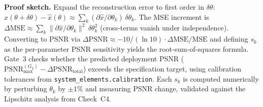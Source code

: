 \documentclass[11pt,a4paper]{article}
\begin{document}
\textbf{Proof sketch.}
Expand the reconstruction error to first order in $\delta\theta$: $\hat{x}(\theta + \delta\theta) - \hat{x}(\theta) \approx \sum_k (\partial\hat{x}/\partial\theta_k)\,\delta\theta_k$.  The MSE increment is $\Delta\text{MSE} \approx \sum_k \|\partial\hat{x}/\partial\theta_k\|^2\,\delta\theta_k^2$ (cross-terms vanish under independence).  Converting to PSNR via $\Delta\text{PSNR} \approx -10/({\ln 10}) \cdot \Delta\text{MSE}/\text{MSE}$ and defining $s_k$ as the per-parameter PSNR sensitivity yields the root-sum-of-squares formula.  Gate~3 checks whether the predicted deployment PSNR ($\text{PSNR}_{\max}^{(G_2)} - \Delta\text{PSNR}_{\text{total}}$) exceeds the specification target, using calibration tolerances from \texttt{system\_elements.calibration}.  Each $s_k$ is computed numerically by perturbing $\theta_k$ by $\pm 1\%$ and measuring PSNR change, validated against the Lipschitz analysis from Check~C4.
\end{document}
